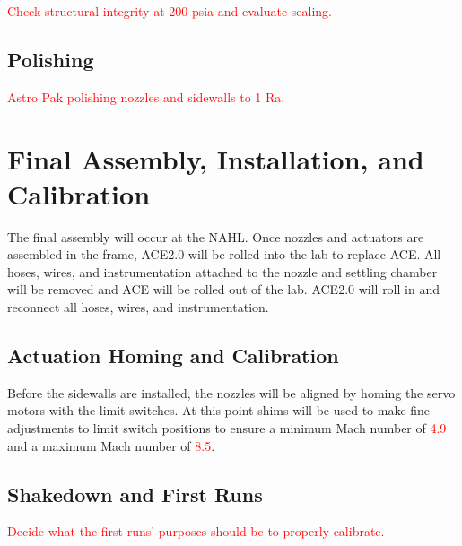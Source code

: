 \textcolor{red}{Check structural integrity at 200 psia and evaluate sealing.}

\subsection{Polishing}

\textcolor{red}{Astro Pak polishing nozzles and sidewalls to 1 Ra.}

\section{Final Assembly, Installation, and Calibration}

The final assembly will occur at the NAHL. Once nozzles and actuators are assembled in the frame, ACE2.0 will be rolled into the lab to replace ACE. All hoses, wires, and instrumentation attached to the nozzle and settling chamber will be removed and ACE will be rolled out of the lab. ACE2.0 will roll in and reconnect all hoses, wires, and instrumentation.

\subsection{Actuation Homing and Calibration}

Before the sidewalls are installed, the nozzles will be aligned by homing the servo motors with the limit switches. At this point shims will be used to make fine adjustments to limit switch positions to ensure a minimum Mach number of \textcolor{red}{4.9} and a maximum Mach number of \textcolor{red}{8.5}.

\subsection{Shakedown and First Runs}

\textcolor{red}{Decide what the first runs' purposes should be to properly calibrate.}

